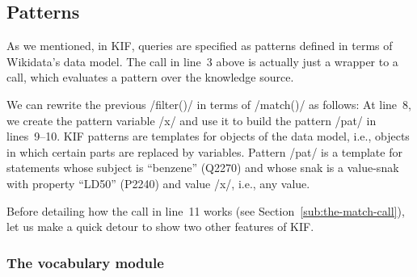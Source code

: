\enlargethispage*{3pt}


\subsection{Patterns}%
\label{sub:patterns}


As we mentioned, in KIF, queries are specified as patterns defined in terms of Wikidata's data model.
The  call in line~3 above is actually just a wrapper to a  call, which evaluates a pattern over the knowledge source.


We can rewrite the previous \code/filter()/ in terms of \code/match()/ as follows:
%
At line~8, we create the pattern variable \code/x/ and use it to build the pattern \code/pat/ in lines~9--10.
KIF patterns are templates for objects of the data model, i.e., objects in which certain parts are replaced by variables.
Pattern \code/pat/ is a template for statements whose subject is ``benzene'' (Q2270) and whose snak is a value-snak with property ``LD50'' (P2240) and value \code/x/, i.e., any value.




Before detailing how the  call in line~11 works (see Section~\ref{sub:the-match-call}), let us make a quick detour to show two other features of KIF.%


\enlargethispage*{4pt}


\subsubsection{The vocabulary module}



